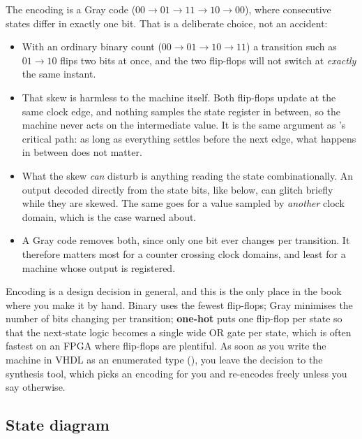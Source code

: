 The encoding is a Gray code ($00 \to 01 \to 11 \to 10 \to 00$), where consecutive states differ in
exactly one bit. That is a deliberate choice, not an accident:
\begin{itemize}
  \item With an ordinary binary count ($00 \to 01 \to 10 \to 11$) a transition such as
    $01 \to 10$ flips two bits at once, and the two flip-flops will not switch at \emph{exactly} the
    same instant.
  \item That skew is harmless to the machine itself. Both flip-flops update at the same clock edge,
    and nothing samples the state register in between, so the machine never acts on the intermediate
    value. It is the same argument as 's critical path: as long as everything
    settles before the next edge, what happens in between does not matter.
  \item What the skew \emph{can} disturb is anything reading the state combinationally. An output
    decoded directly from the state bits, like  below, can glitch briefly while they are
    skewed. The same goes for a value sampled by \emph{another} clock domain, which is the case
     warned about.
  \item A Gray code removes both, since only one bit ever changes per transition. It therefore
    matters most for a counter crossing clock domains, and least for a machine whose output is
    registered.
\end{itemize}

Encoding is a design decision in general, and this is the only place in the book where you make it
by hand. Binary uses the fewest flip-flops; Gray minimises the number of bits changing per
transition; \textbf{one-hot} puts one flip-flop per state so that the next-state logic becomes a
single wide OR gate per state, which is often fastest on an FPGA where flip-flops are plentiful. As
soon as you write the machine in VHDL as an enumerated type (), you leave the
decision to the synthesis tool, which picks an encoding for you and re-encodes freely unless you say
otherwise.

\subsection*{State diagram}


